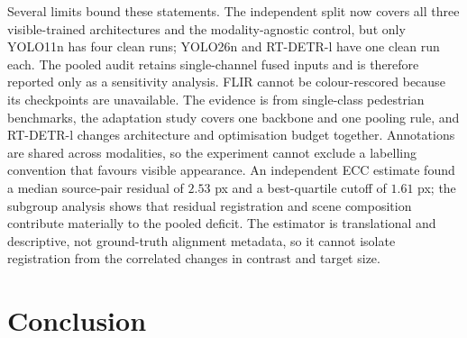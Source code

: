 \documentclass[preprint,10pt]{elsarticle}
\begin{document}
\begin{sloppypar}
Several limits bound these statements. The independent split now covers all three
visible-trained architectures and the modality-agnostic control, but only YOLO11n has
four clean runs; YOLO26n and RT-DETR-l have one clean run each. The pooled audit retains
single-channel fused inputs and is therefore reported only as a sensitivity analysis.
FLIR cannot be colour-rescored because its checkpoints are unavailable. The evidence is from
single-class pedestrian benchmarks, the adaptation study covers one backbone and one
pooling rule, and RT-DETR-l changes architecture and optimisation budget together.
Annotations are shared across modalities, so the experiment cannot exclude a labelling
convention that favours visible appearance. An independent ECC estimate found a median
source-pair residual of $2.53$ px and a best-quartile cutoff of $1.61$ px; the subgroup
analysis shows that residual registration and scene composition contribute materially to
the pooled deficit. The estimator is translational and descriptive, not ground-truth
alignment metadata, so it cannot isolate registration from the correlated changes in
contrast and target size.
\end{sloppypar}

\section{Conclusion}
\label{sec:conclusion}
\end{document}
